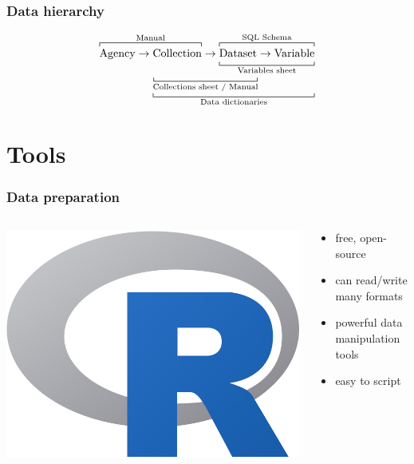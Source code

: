 \documentclass{beamer}
\begin{document}
\begin{frame}
    \frametitle{Data hierarchy}

    \begin{center}

        \begin{align*}
            \overbracket[0.5pt]{\strut
            \text{Agency} \rightarrow
                \text{Collection}}^{\text{Manual}}
            \rightarrow
                    \underbracket[0.5pt]{\overbracket[0.5pt]{\strut
                    \text{Dataset} \rightarrow \text{Variable}
                    }^{\text{SQL Schema}}
                    }_{\text{Variables sheet}} \\[-1em]
                \hphantom{\text{Agency} \rightarrow}
                \underbracket[0.5pt]{
                \underbracket[0.5pt]{\hphantom{
                    \text{Collection} \rightarrow \text{Dataset}
                }}_{\text{Collections sheet / Manual}}
                \hphantom{\rightarrow \text{Variable}}
                }_{\text{Data dictionaries}}
        \end{align*}
    \end{center}
\end{frame}

\section{Tools}

\begin{frame}
    \frametitle{Data preparation}

    \begin{columns}
        \begin{column}{0.4\textwidth}
            \centering
            \includegraphics[width=0.7\linewidth]{rlogo.png}
        \end{column}
        \begin{column}{0.6\textwidth}
            \begin{itemize}
                \item free, open-source
                \item can read/write many formats
                \item powerful data manipulation tools
                \item easy to script
            \end{itemize}
        \end{column}
    \end{columns}
\end{frame}
\end{document}
